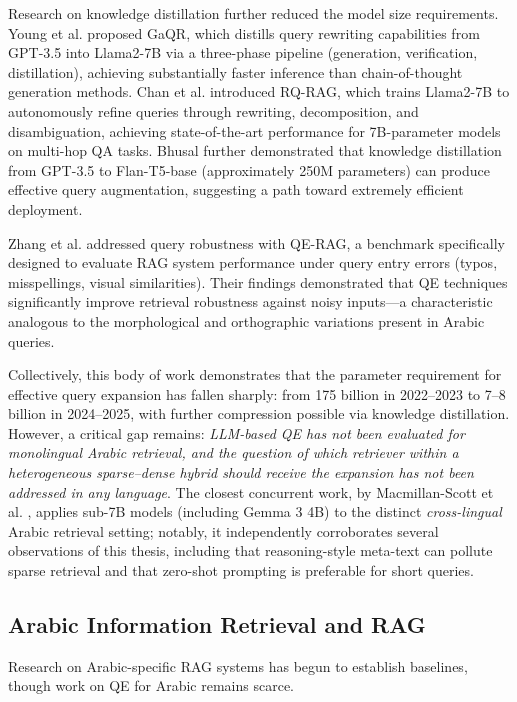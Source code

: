 Research on knowledge distillation further reduced the model size requirements. Young et al. \cite{young_2024_gaqr} proposed GaQR, which distills query rewriting capabilities from GPT-3.5 into Llama2-7B via a three-phase pipeline (generation, verification, distillation), achieving substantially faster inference than chain-of-thought generation methods. Chan et al. \cite{chan_2024_rqrag} introduced RQ-RAG, which trains Llama2-7B to autonomously refine queries through rewriting, decomposition, and disambiguation, achieving state-of-the-art performance for 7B-parameter models on multi-hop QA tasks. Bhusal \cite{louis_2024_query} further demonstrated that knowledge distillation from GPT-3.5 to Flan-T5-base (approximately 250M parameters) can produce effective query augmentation, suggesting a path toward extremely efficient deployment.

Zhang et al. \cite{zhang_2025_qerag} addressed query robustness with QE-RAG, a benchmark specifically designed to evaluate RAG system performance under query entry errors (typos, misspellings, visual similarities). Their findings demonstrated that QE techniques significantly improve retrieval robustness against noisy inputs---a characteristic analogous to the morphological and orthographic variations present in Arabic queries.

Collectively, this body of work demonstrates that the parameter requirement for effective query expansion has fallen sharply: from 175 billion in 2022--2023 to 7--8 billion in 2024--2025, with further compression possible via knowledge distillation. However, a critical gap remains: \textit{LLM-based QE has not been evaluated for monolingual Arabic retrieval, and the question of which retriever within a heterogeneous sparse--dense hybrid should receive the expansion has not been addressed in any language}. The closest concurrent work, by Macmillan-Scott et al. \cite{macmillanscott_2025_generative}, applies sub-7B models (including Gemma 3 4B) to the distinct \textit{cross-lingual} Arabic retrieval setting; notably, it independently corroborates several observations of this thesis, including that reasoning-style meta-text can pollute sparse retrieval and that zero-shot prompting is preferable for short queries.

\subsection{Arabic Information Retrieval and RAG}
\label{sec:arabic_ir}

Research on Arabic-specific RAG systems has begun to establish baselines, though work on QE for Arabic remains scarce.

